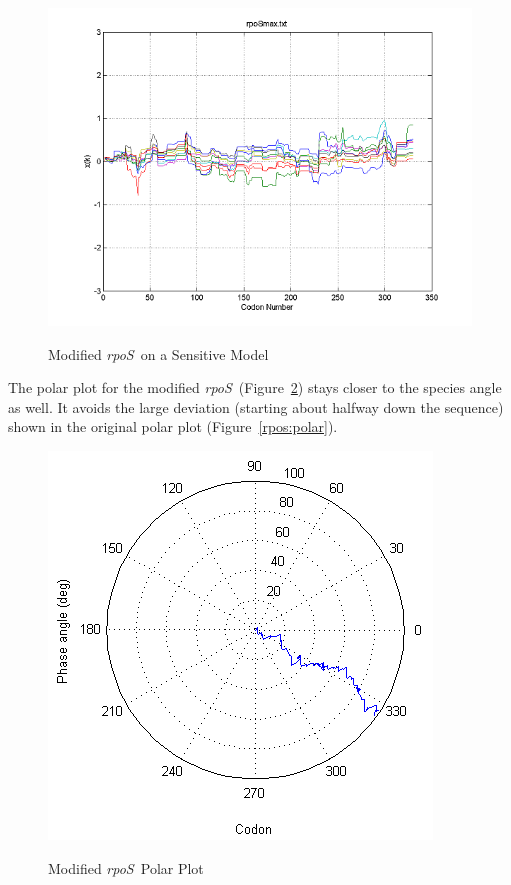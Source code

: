 \documentclass[10pt,twocolumn]{article}
\newcommand{\rpoS}{\emph{rpoS}}
\begin{document}
\begin{figure}[htp]
    \centering
    \caption{Modified \rpoS\ on a Sensitive Model}
    \label{rposmax:sensdisp}
    {\includegraphics[scale=0.8]{rpoSmax_sens.png}}
\end{figure}

The polar plot for the modified \rpoS\ (Figure~\ref{rposmax:polar}) stays closer to the species angle as well.  
It avoids the large deviation (starting about halfway down the sequence) shown in the original polar plot (Figure~\ref{rpos:polar}).

\begin{figure}[htp]
    \centering
    \caption{Modified \rpoS\ Polar Plot}
    \label{rposmax:polar}
    {\includegraphics[scale=0.7]{rpoSmax_polar.png}}
\end{figure}
\end{document}
